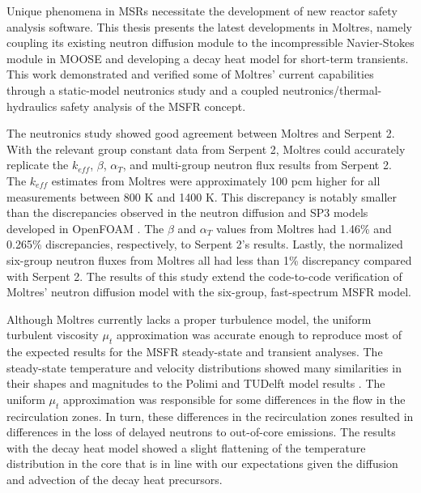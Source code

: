 Unique phenomena in \glspl{MSR} necessitate the development of new reactor
safety analysis software. This thesis presents the latest developments in
Moltres, namely coupling its existing neutron diffusion module to the
incompressible Navier-Stokes module in MOOSE and developing a decay heat model
for short-term transients. This work demonstrated and verified some of
Moltres' current capabilities through a static-model
neutronics study and a coupled neutronics/thermal-hydraulics safety analysis
of the \gls{MSFR} concept.

The neutronics study showed good agreement between Moltres and Serpent 2. With
the relevant group constant data from Serpent 2,
Moltres could accurately replicate the $k_{eff}$, $\beta$,
$\alpha_T$, and multi-group neutron flux results from Serpent 2. The
$k_{eff}$ estimates from Moltres were approximately 100 pcm higher for all
measurements between 800 K and 1400 K. This discrepancy is notably smaller
than the discrepancies observed in the neutron diffusion and SP3 models
developed in OpenFOAM \cite{aufiero_extended_2013}. The $\beta$ and $\alpha_T$
values from Moltres had 1.46\% and 0.265\% discrepancies, respectively, to
Serpent 2's results. Lastly, the normalized six-group neutron fluxes from
Moltres all had less than 1\% discrepancy compared with Serpent 2.
The results of this study extend
the code-to-code verification of Moltres'
neutron diffusion model with the six-group, fast-spectrum \gls{MSFR} model.

Although Moltres currently lacks a proper turbulence model, the uniform
turbulent viscosity $\mu_t$ approximation was accurate enough to reproduce
most of the expected results for the \gls{MSFR}
steady-state and transient analyses. The steady-state temperature and velocity
distributions showed many similarities in their shapes and magnitudes to the
Polimi and TUDelft model results \cite{fiorina_modelling_2014}. The uniform
$\mu_t$ approximation was responsible for some differences in the flow in the
recirculation zones. In turn, these differences in the recirculation zones
resulted in
differences in the loss of delayed neutrons to out-of-core emissions.
The results with the decay heat model showed a slight flattening of the
temperature distribution in the core that is in line with our expectations
given the diffusion and advection of the decay heat precursors.


